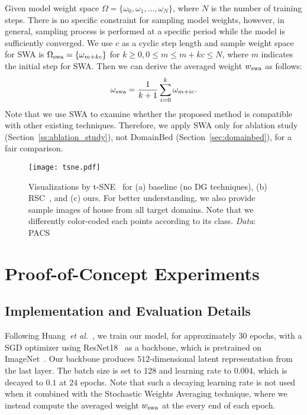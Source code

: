 \documentclass[10pt,twocolumn,letterpaper]{article}
\renewcommand{\etal}{\textit{et al.}}
\begin{document}
Given model weight space $\Omega=\{\omega_0, \omega_1, \dots, \omega_N\}$, where $N$ is the number of training steps. There is no specific constraint for sampling model weights, however, in general, sampling process is performed at a specific period while the model is sufficiently converged. We use $c$ as a cyclic step length and sample weight space for SWA is $\Omega_\textnormal{swa}=\{\omega_{m+kc}\}$ for $k \geq 0, 0 \leq m \leq m+kc \leq N$, where $m$ indicates the initial step for SWA. Then we can derive the averaged weight $w_\textnormal{swa}$ as follows:
\begin{equation}
    \omega_\textnormal{swa} = \frac{1}{k+1}\sum_{i=0}^{k}{\omega_{m+ic}}. 
\end{equation}
Note that we use SWA to examine whether the proposed method is compatible with other existing techniques. Therefore, we apply SWA only for ablation study (Section~\ref{ss:ablation_study}), not DomainBed (Section~\ref{sec:domainbed}), for a fair comparison.


\begin{figure*}[t]
\begin{center}
   \texttt{[image: tsne.pdf]}
\end{center}
   \caption{Visualizations by t-SNE~\cite{van2008visualizing} for (a) baseline (no DG techniques), (b) RSC~\cite{huangRSC2020}, and (c) ours. For better understanding, we also provide sample images of house from all target domains. Note that we differently color-coded each points according to its class. {\textit{Data}}: PACS~\cite{Li2017dg}}
\label{fig:tsne}
\end{figure*}

\section{Proof-of-Concept Experiments}
\subsection{Implementation and Evaluation Details}
Following Huang~\etal~\cite{huangRSC2020}, we train our model, for approximately 30 epochs, with a SGD optimizer using ResNet18~\cite{he2016deep} as a backbone, which is pretrained on ImageNet~\cite{deng2009imagenet}. Our backbone produces $512$-dimensional latent representation from the last layer. The batch size is set to 128 and learning rate to 0.004, which is decayed to $0.1$ at $24$ epochs. Note that such a decaying learning rate is not used when it combined with the Stochastic Weights Averaging technique, where we instead compute the averaged weight $w_\textnormal{swa}$ at the every end of each epoch. 
\end{document}
